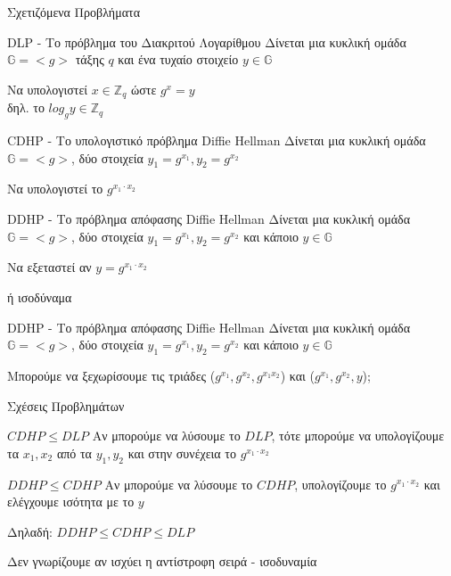 \documentclass[handout]{beamer}
\begin{document}
\begin{frame}[allowframebreaks]{Σχετιζόμενα Προβλήματα}

\begin{block}{DLP - Το πρόβλημα του Διακριτού Λογαρίθμου}
Δίνεται μια κυκλική ομάδα $\mathbb{G}=<g>$ τάξης $q$ και ένα τυχαίο στοιχείο $y \in \mathbb{G}$

Να υπολογιστεί $x \in \mathbb{Z}_q$ ώστε $g^x = y$ \\
δηλ. το $log_g y \in \mathbb{Z}_q$
\end{block}

\framebreak

\begin{block}{CDHP - Το υπολογιστικό πρόβλημα Diffie Hellman}
Δίνεται μια κυκλική ομάδα $\mathbb{G}=<g>$, δύο στοιχεία $y_1=g^{x_1}, y_2 = g^{x_2}$

Να υπολογιστεί το $g^{x_1 \cdot x_2}$ 
\end{block}


\framebreak
{}

\begin{block}{DDHP - Το πρόβλημα απόφασης Diffie Hellman}
Δίνεται μια κυκλική  ομάδα $\mathbb{G}=<g>$, δύο στοιχεία $y_1=g^{x_1}, y_2 = g^{x_2}$ και κάποιο  $y \in \mathbb{G}$ 

Να εξεταστεί αν  $y = g^{x_1 \cdot x_2}$ 
\end{block}
ή ισοδύναμα
\begin{block}{DDHP - Το πρόβλημα απόφασης Diffie Hellman}
Δίνεται μια κυκλική  ομάδα $\mathbb{G}=<g>$, δύο στοιχεία $y_1=g^{x_1}, y_2 = g^{x_2}$ και κάποιο  $y \in \mathbb{G}$ 

Μπορούμε να ξεχωρίσουμε τις τριάδες ($g^{x_1}, g^{x_2}, g^{x_1x_2}$) και  ($g^{x_1}, g^{x_2}, y$);
\end{block}
\end{frame}

\begin{frame}{Σχέσεις Προβλημάτων}
\begin{block}{$CDHP \leq DLP$}
Αν μπορούμε να λύσουμε το $DLP$, τότε μπορούμε να υπολογίζουμε τα $x_1, x_2$ από τα $y_1, y_2$ και στην συνέχεια το $g^{x_1 \cdot x_2}$
\end{block}

\pause
 
\begin{block}{$DDHP \leq CDHP$}
Αν μπορούμε να λύσουμε το $CDHP$, υπολογίζουμε το $g^{x_1 \cdot x_2}$ και ελέγχουμε ισότητα με το $y$
\end{block}
 
\pause 
Δηλαδή: $DDHP \leq CDHP \leq DLP$

\alert{Δεν γνωρίζουμε αν ισχύει η αντίστροφη σειρά - ισοδυναμία}
\end{frame}
\end{document}
